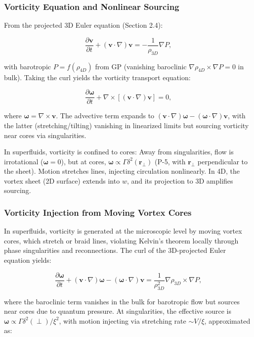 \documentclass{article}
\begin{document}
\subsubsection{Vorticity Equation and Nonlinear Sourcing}

From the projected 3D Euler equation (Section 2.4):

\[
\frac{\partial \mathbf{v}}{\partial t} + (\mathbf{v} \cdot \nabla) \mathbf{v} = -\frac{1}{\rho_{3D}} \nabla P,
\]

with barotropic $P = f(\rho_{4D})$ from GP (vanishing baroclinic $\nabla \rho_{4D} \times \nabla P = 0$ in bulk). Taking the curl yields the vorticity transport equation:

\[
\frac{\partial \boldsymbol{\omega}}{\partial t} + \nabla \times [(\mathbf{v} \cdot \nabla) \mathbf{v}] = 0,
\]

where $\boldsymbol{\omega} = \nabla \times \mathbf{v}$. The advective term expands to $(\mathbf{v} \cdot \nabla) \boldsymbol{\omega} - (\boldsymbol{\omega} \cdot \nabla) \mathbf{v}$, with the latter (stretching/tilting) vanishing in linearized limits but sourcing vorticity near cores via singularities.

In superfluids, vorticity is confined to cores: Away from singularities, flow is irrotational ($\boldsymbol{\omega} = 0$), but at cores, $\boldsymbol{\omega} \propto \Gamma \delta^2(\mathbf{r}_\perp)$ (P-5, with $\mathbf{r}_\perp$ perpendicular to the sheet). Motion stretches lines, injecting circulation nonlinearly. In 4D, the vortex sheet (2D surface) extends into $w$, and its projection to 3D amplifies sourcing.

\subsubsection{Vorticity Injection from Moving Vortex Cores}

In superfluids, vorticity is generated at the microscopic level by moving vortex cores, which stretch or braid lines, violating Kelvin's theorem locally through phase singularities and reconnections. The curl of the 3D-projected Euler equation yields:

\[
\frac{\partial \boldsymbol{\omega}}{\partial t} + (\mathbf{v} \cdot \nabla) \boldsymbol{\omega} - (\boldsymbol{\omega} \cdot \nabla) \mathbf{v} = \frac{1}{\rho_{3D}^2} \nabla \rho_{3D} \times \nabla P,
\]

where the baroclinic term vanishes in the bulk for barotropic flow but sources near cores due to quantum pressure. At singularities, the effective source is \(\boldsymbol{\omega} \propto \Gamma \delta^2(\perp) / \xi^2\), with motion injecting via stretching rate \(\sim V / \xi\), approximated as:
\end{document}
